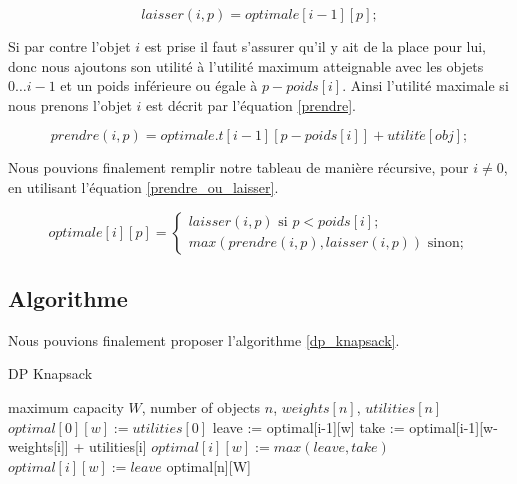 \begin{equation}
\label{laisser}
laisser(i, p) = optimale[i-1][p];
\end{equation}


Si par contre l'objet $i$ est prise il faut s'assurer qu'il y ait de la place pour lui, donc nous ajoutons son utilité à l'utilité maximum atteignable avec les objets $0 \dots i-1$ et un poids inférieure ou égale à $p-poids[i]$. Ainsi l'utilité maximale si nous prenons l'objet $i$ est décrit par l'équation \ref{prendre}.

\begin{equation}
\label{prendre}
prendre(i, p) = optimale.t[i-1][p - poids[i]] + utilit\acute{e}[obj];
\end{equation}

Nous pouvions finalement remplir notre tableau de manière récursive, pour $i \neq 0$, en utilisant l'équation \ref{prendre_ou_laisser}.

\begin{equation}
\label{prendre_ou_laisser}
optimale[i][p] =
	\begin{cases}
		laisser(i, p) \text{ si } p < poids[i];	\\
		max(prendre(i, p), laisser(i, p)) \text{ sinon};
	\end{cases}
\end{equation}


\subsection{Algorithme}

Nous pouvions finalement proposer l'algorithme \ref{dp_knapsack}.

\begin{algorithm}[!ht]
\caption{DP Knapsack}
\label{dp_knapsack}
\begin{algorithmic}[1]
\REQUIRE maximum capacity $W$, number of objects $n$, $weights[n]$, $utilities[n]$  
		\STATE $optimal[0][w] := utilities[0]$
	\ENDIF
\ENDFOR
{}
		\STATE leave := optimal[i-1][w]
		\STATE take := optimal[i-1][w-weights[i]] + utilities[i]
			\STATE $optimal[i][w] := max(leave, take)$
		\ELSE
			\STATE $optimal[i][w] := leave$
		\ENDIF
	\ENDFOR
\ENDFOR
\RETURN optimal[n][W]
\end{algorithmic}
\end{algorithm}

